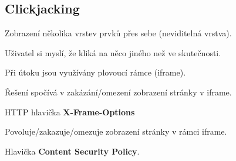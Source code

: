 \subsection{Clickjacking}

\begin{compactitem}
    \item Zobrazení několika vrstev prvků přes sebe (neviditelná vrstva).
    \item Uživatel si myslí, že kliká na něco jiného než ve skutečnosti.
    \item Při útoku jsou využívány plovoucí rámce (iframe).
    \item Řešení spočívá v zakázání/omezení zobrazení stránky v iframe.

    \item HTTP hlavička \textbf{X-Frame-Options} \begin{compactitem}
        \item Povoluje/zakazuje/omezuje zobrazení stránky v rámci iframe.
    \end{compactitem}

    \item Hlavička \textbf{Content Security Policy}.
\end{compactitem}


